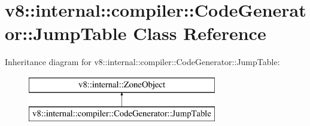 \hypertarget{classv8_1_1internal_1_1compiler_1_1_code_generator_1_1_jump_table}{}\section{v8\+:\+:internal\+:\+:compiler\+:\+:Code\+Generator\+:\+:Jump\+Table Class Reference}
\label{classv8_1_1internal_1_1compiler_1_1_code_generator_1_1_jump_table}
Inheritance diagram for v8\+:\+:internal\+:\+:compiler\+:\+:Code\+Generator\+:\+:Jump\+Table\+:\begin{figure}[H]
\begin{center}
\leavevmode
\includegraphics[height=2.000000cm]{classv8_1_1internal_1_1compiler_1_1_code_generator_1_1_jump_table}
\end{center}
\end{figure}
